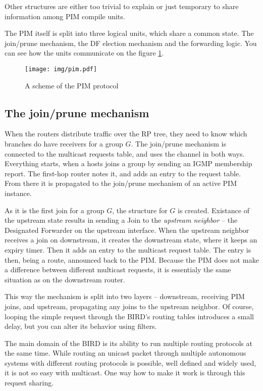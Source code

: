 \noindent Other structures are either too trivial to explain or just temporary
to share information among PIM compile units.

The PIM itself is split into three logical units, which share a common state.
The join/prune mechanism, the DF election mechanism and the forwarding logic.
You can see how the units communicate on the figure \ref{pim-units}.

\begin{figure}[htp]
\centering
\texttt{[image: img/pim.pdf]}
\caption{A scheme of the PIM protocol}
\label{pim-units}
\end{figure}

\subsection{The join/prune mechanism}
When the routers distribute traffic over the RP tree, they need to know which
branches do have receivers for a group $G$. The join/prune mechanism is connected to
the multicast requests table, and uses the channel in both ways. Everything
starts, when a hosts joins a group by sending an IGMP membership report. The
first-hop router notes it, and adds an entry to the request table. From there it is
propagated to the join/prune mechanism of an active PIM instance.

As it is the first join for a group $G$, the  structure for $G$ is
created. Existance of the upstream state results in sending a Join to the
\emph{upstream neighbor} -- the Designated Forwarder on the upstream interface.
When the upstream neighbor receives a join on downstream, it creates the
downstream state, where it keeps an expiry timer. Then it adds an entry to the
multicast request table. The entry is then, being a route, announced back to
the PIM. Because the PIM does not make a difference between different multicast
requests, it is essentialy the same situation as on the downstream router.

\label{why-pim-mreq}
This way the mechanism is split into two layers -- downstream, receiving PIM
joins, and upstream, propagating any joins to the upstream neighbor. Of course,
looping the simple request through the BIRD's routing tables introduces a small
delay, but you can alter its behavior using filters.

The main domain of the BIRD is its ability to run multiple routing protocols at
the same time. While routing an unicast packet through multiple autonomous
systems with different routing protocols is possible, well defined and widely
used, it is not so easy with multicast. One way how to make it work is through
this request sharing.

